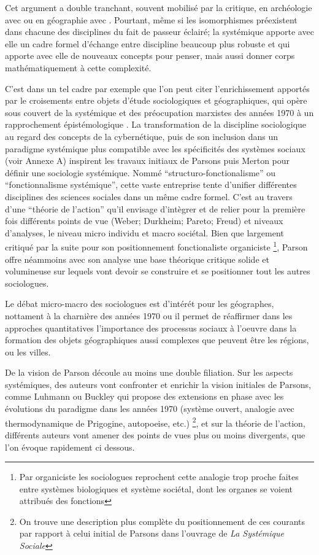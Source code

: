 Cet argument a double tranchant, souvent mobilisé par la critique, en archéologie avec \textcite{Salmon1978} ou en géographie avec \textcite{Chisholm1967}. Pourtant, même si les isomorphismes préexistent dans chacune des disciplines du fait de passeur éclairé; la systémique apporte avec elle un cadre formel d'échange entre discipline beaucoup plus robuste et qui apporte avec elle de nouveaux concepts pour penser, mais aussi donner corps mathématiquement à cette complexité.

C'est dans un tel cadre par exemple que l'on peut citer l'enrichissement apportés par le croisements entre objets d'étude sociologiques et géographiques, qui opère sous couvert de la systémique et des préocupation marxistes des années 1970 à un rapprochement épistémologique \autocite{Claval1995}. La transformation de la discipline sociologique au regard des concepts de la cybernétique, puis de son inclusion dans un paradigme systémique plus compatible avec les spécificités des systèmes sociaux (voir Annexe A) inspirent les travaux initiaux de Parsons puis Merton pour définir une sociologie systémique. Nommé \enquote{structuro-fonctionalisme} ou \enquote{fonctionnalisme systémique}, cette vaste entreprise tente d'unifier différentes disciplines des sciences sociales dans un même cadre formel. C'est au travers d'une \enquote{théorie de l'action}  qu'il envisage d'intègrer et de relier pour la première fois différents points de vue (Weber; Durkheim; Pareto; Freud) et niveaux d'analyses, le niveau micro individu et macro sociétal. Bien que largement critiqué par la suite pour son positionnement fonctionaliste organiciste \footnote{Par organiciste les sociologues reprochent cette analogie trop proche faites entre systèmes biologiques et système sociétal, dont les organes se voient attribués des fonctions}, Parson offre néammoins avec son analyse une base théorique critique solide et volumineuse sur lequels vont devoir se construire et se positionner tout les autres sociologues. 

Le débat micro-macro des sociologues est d'intérét pour les géographes, nottament à la charnière des années 1970 ou il permet de réaffirmer dans les approches quantitatives l'importance des processus sociaux à l'oeuvre dans la formation des objets géographiques aussi complexes que peuvent être les régions, ou les villes.

De la vision de Parson découle au moins une double filiation. Sur les aspects systémiques, des auteurs vont confronter et enrichir la vision initiales de Parsons, comme Luhmann ou Buckley qui propose des extensions en phase avec les évolutions du paradigme dans les années 1970 (système ouvert, analogie avec thermodynamique de Prigogine, autopoeise, etc.) \footnote{On trouve une description plus complète du positionnement de ces courants par rapport à celui initial de Parsons dans l'ouvrage de \textcite{Lugan2009} \textit{La Systémique Sociale}}, et sur la théorie de l'action, différents auteurs vont amener des points de vues plus ou moins divergents, que l'on évoque rapidement ci dessous.


